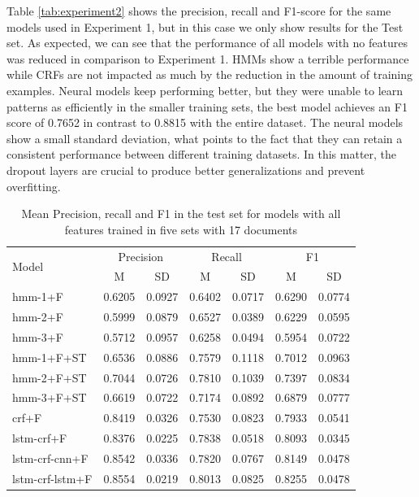 \documentclass{nle}
\begin{document}
Table \ref{tab:experiment2} shows the precision, recall and F1-score for the same models
used in Experiment 1, but in this case we only show results for the Test set.
As expected, we can see that the performance of all models with no features was reduced in comparison 
to Experiment 1. HMMs show a terrible performance while CRFs are not 
impacted as much by the reduction in the amount of training examples. Neural models
keep performing better, but they were unable to learn patterns as efficiently in
the smaller training sets, the best model achieves an F1 score of 0.7652 in contrast to
0.8815 with the entire dataset. The neural models show a small standard deviation, what
points to the fact that they can retain a consistent performance between different training 
datasets. In this matter, the dropout layers are crucial to produce better generalizations 
and prevent overfitting.

\begin{table}[h]
  \small
  \begin{center}
    \begin{tabular}{lllllll}
      \toprule
      \multirow{2}{*}{Model} & \multicolumn{2}{c}{Precision} & \multicolumn{2}{c}{Recall} & \multicolumn{2}{c}{F1} \\
                             & \multicolumn{1}{c}{\tiny{M}} & \multicolumn{1}{c}{\tiny{SD}}
			     & \multicolumn{1}{c}{\tiny{M}} & \multicolumn{1}{c}{\tiny{SD}}
			     & \multicolumn{1}{c}{\tiny{M}} & \multicolumn{1}{c}{\tiny{SD}} \\
      \midrule
      hmm-1+F	      & 0.6205 & 0.0927 & 0.6402 & 0.0717 & 0.6290 & 0.0774 \\
      hmm-2+F	      & 0.5999 & 0.0879 & 0.6527 & 0.0389 & 0.6229 & 0.0595 \\
      hmm-3+F	      & 0.5712 & 0.0957 & 0.6258 & 0.0494 & 0.5954 & 0.0722 \\
      hmm-1+F+ST      & 0.6536 & 0.0886 & 0.7579 & 0.1118 & 0.7012 & 0.0963 \\
      hmm-2+F+ST      & 0.7044 & 0.0726 & 0.7810 & 0.1039 & 0.7397 & 0.0834 \\
      hmm-3+F+ST      & 0.6619 & 0.0722 & 0.7174 & 0.0892 & 0.6879 & 0.0777 \\
      crf+F	      & 0.8419 & 0.0326 & 0.7530 & 0.0823 & 0.7933 & 0.0541 \\
      lstm-crf+F      & 0.8376 & 0.0225 & 0.7838 & 0.0518 & 0.8093 & 0.0345 \\
      lstm-crf-cnn+F  & 0.8542 & 0.0336 & 0.7820 & 0.0767 & 0.8149 & 0.0478 \\
      lstm-crf-lstm+F & 0.8554 & 0.0219 & 0.8013 & 0.0825 & 0.8255 & 0.0478 \\
      \bottomrule
    \end{tabular}
  \end{center}
  \caption{Mean Precision, recall and F1 in the test set for models with all features
   trained in five sets with 17 documents}
  \label{tab:experiment2f}
\end{table}
\end{document}
